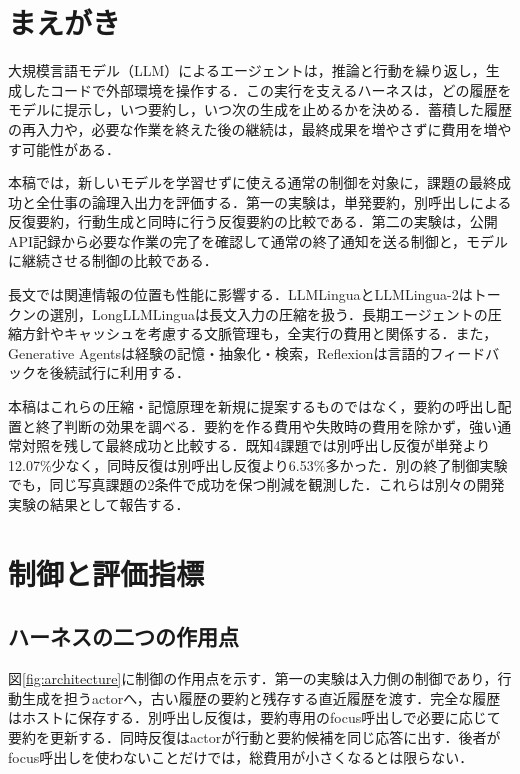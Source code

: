 \documentclass[letter]{ieicej}
\begin{document}
\maketitle


\section{まえがき}
大規模言語モデル（LLM）によるエージェントは，推論と行動を繰り返し\cite{yao2023react}，生成したコードで外部環境を操作する\cite{wang2024codeact}．この実行を支えるハーネスは，どの履歴をモデルに提示し，いつ要約し，いつ次の生成を止めるかを決める．蓄積した履歴の再入力や，必要な作業を終えた後の継続は，最終成果を増やさずに費用を増やす可能性がある．

本稿では，新しいモデルを学習せずに使える通常の制御を対象に，課題の最終成功と全仕事の論理入出力を評価する．第一の実験は，単発要約，別呼出しによる反復要約，行動生成と同時に行う反復要約の比較である．第二の実験は，公開API記録から必要な作業の完了を確認して通常の終了通知を送る制御と，モデルに継続させる制御の比較である．

長文では関連情報の位置も性能に影響する\cite{liu2024lost}．LLMLingua\cite{jiang2023llmlingua}とLLMLingua-2\cite{pan2024llmlingua2}はトークンの選別，LongLLMLingua\cite{jiang2024longllmlingua}は長文入力の圧縮を扱う．長期エージェントの圧縮方針\cite{kang2026acon}やキャッシュを考慮する文脈管理\cite{xu2026tokenpilot}も，全実行の費用と関係する．また，Generative Agents\cite{park2023generative}は経験の記憶・抽象化・検索，Reflexion\cite{shinn2023reflexion}は言語的フィードバックを後続試行に利用する．

本稿はこれらの圧縮・記憶原理を新規に提案するものではなく，要約の呼出し配置と終了判断の効果を調べる．要約を作る費用や失敗時の費用を除かず，強い通常対照を残して最終成功と比較する．既知4課題では別呼出し反復が単発より12.07\%少なく，同時反復は別呼出し反復より6.53\%多かった．別の終了制御実験でも，同じ写真課題の2条件で成功を保つ削減を観測した．これらは別々の開発実験の結果として報告する．

\section{制御と評価指標}
\subsection{ハーネスの二つの作用点}
図\ref{fig:architecture}に制御の作用点を示す．第一の実験は入力側の制御であり，行動生成を担うactorへ，古い履歴の要約と残存する直近履歴を渡す．完全な履歴はホストに保存する．別呼出し反復は，要約専用のfocus呼出しで必要に応じて要約を更新する．同時反復はactorが行動と要約候補を同じ応答に出す．後者がfocus呼出しを使わないことだけでは，総費用が小さくなるとは限らない．
\end{document}
